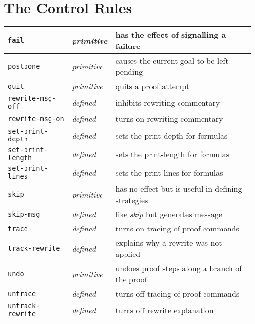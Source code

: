 \documentclass[12pt,twoside]{book}
\makeatletter
\newcommand{\indtt}[1]{\texttt{#1}\index{#1@{\texttt{#1}}}}  %
\makeatother
\begin{document}
\section{The Control Rules}
\begin{tabular}{|l|l|l|}\hline
\indtt{fail} & \emph{primitive} &  has the effect of signalling a failure\\\hline
\indtt{postpone}& \emph{primitive} &  causes the current goal to be
left pending\\\hline
\indtt{quit} & \emph{primitive} & quits a proof attempt \\\hline
\indtt{rewrite-msg-off} & \emph{defined} & inhibits rewriting
commentary\\\hline
\indtt{rewrite-msg-on} & \emph{defined} & turns on rewriting
commentary\\\hline
\indtt{set-print-depth} & \emph{defined} & sets the print-depth for formulas \\\hline
\indtt{set-print-length} & \emph{defined} & sets the print-length for formulas \\\hline
\indtt{set-print-lines} & \emph{defined} & sets the print-lines for formulas \\\hline
\indtt{skip} & \emph{primitive} &  has no effect but is useful in defining
strategies\\\hline
\indtt{skip-msg} & \emph{defined} & like \emph{skip} but generates
message\\\hline
\indtt{trace} & \emph{defined} & turns on tracing of proof
commands\\\hline
\indtt{track-rewrite} & \emph{defined} & explains why a rewrite was not
applied\\\hline
\indtt{undo} & \emph{primitive} & undoes proof steps along a branch of
the proof\\\hline
\indtt{untrace} & \emph{defined} & turns off tracing of proof
commands\\\hline
\indtt{untrack-rewrite} & \emph{defined} & turns off rewrite explanation\\\hline
\end{tabular}
\end{document}
